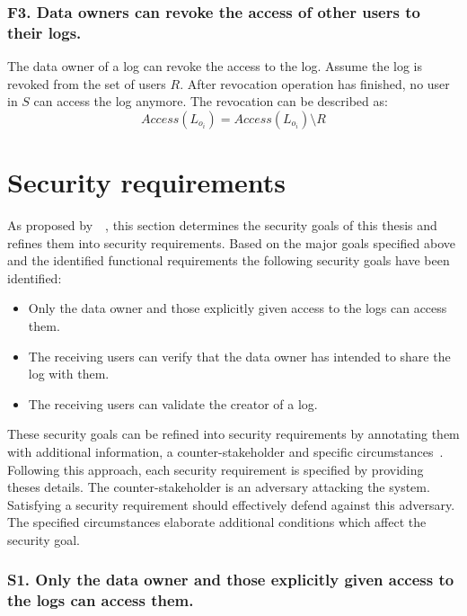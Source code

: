 \documentclass[../main.tex]{subfiles}
\begin{document}
\subsubsection{F3. Data owners can revoke the access of other users to their logs.}
The data owner of a log can revoke the access to the log.
Assume the log is revoked from the set of users $R$.
After revocation operation has finished, no user in $S$ can access the log anymore.
The revocation can be described as:
\begin{displaymath}
    Access(L_{o_i}) = Access(L_{o_i}) \setminus R
\end{displaymath}

\section{Security requirements}\label{security-requriements}
As proposed by~\citeauthor{Fabian2010}~\cite{Fabian2010}, this section determines the security goals of this thesis and refines them into security requirements.
Based on the major goals specified above and the identified functional requirements the following security goals have been identified:

\begin{itemize}
    \item Only the data owner and those explicitly given access to the logs can access them.
    \item The receiving users can verify that the data owner has intended to share the log with them.
    \item The receiving users can validate the creator of a log.
\end{itemize}

These security goals can be refined into security requirements by annotating them with additional information, a counter-stakeholder and specific circumstances~\cite{Fabian2010}.
Following this approach, each security requirement is specified by providing theses details.
The counter-stakeholder is an adversary attacking the system.
Satisfying a security requirement should effectively defend against this adversary.
The specified circumstances elaborate additional conditions which affect the security goal.

\subsubsection{S1. Only the data owner and those explicitly given access to the logs can access them.}
\end{document}
